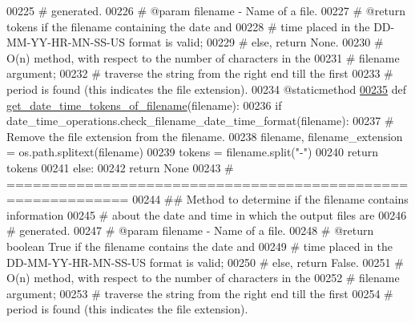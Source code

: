 \begin{DoxyCode}
00225     \textcolor{comment}{#       generated.}
00226     \textcolor{comment}{#   @param filename - Name of a file.}
00227     \textcolor{comment}{#   @return tokens if the filename containing the date and}
00228     \textcolor{comment}{#       time placed in the DD-MM-YY-HR-MN-SS-US format is valid;}
00229     \textcolor{comment}{#       else, return None.}
00230     \textcolor{comment}{#   O(n) method, with respect to the number of characters in the}
00231     \textcolor{comment}{#       filename argument;}
00232     \textcolor{comment}{#       traverse the string from the right end till the first}
00233     \textcolor{comment}{#           period is found (this indicates the file extension).}
00234     @staticmethod
\hypertarget{date__time__processing_8py_source_l00235}{}\hyperlink{classutilities_1_1date__time__processing_1_1date__time__operations_ad6047ac1098493c3511ec209f52250c0}{00235}     \textcolor{keyword}{def }\hyperlink{classutilities_1_1date__time__processing_1_1date__time__operations_ad6047ac1098493c3511ec209f52250c0}{get\_date\_time\_tokens\_of\_filename}(filename):
00236         \textcolor{keywordflow}{if} date\_time\_operations.check\_filename\_date\_time\_format(filename):
00237             \textcolor{comment}{# Remove the file extension from the filename.}
00238             filename, filename\_extension = os.path.splitext(filename)
00239             tokens = filename.split(\textcolor{stringliteral}{"-"})
00240             \textcolor{keywordflow}{return} tokens
00241         \textcolor{keywordflow}{else}:
00242             \textcolor{keywordflow}{return} \textcolor{keywordtype}{None}
00243     \textcolor{comment}{# ============================================================}
00244     \textcolor{comment}{##  Method to determine if the filename contains information}
00245     \textcolor{comment}{#       about the date and time in which the output files are}
00246     \textcolor{comment}{#       generated.}
00247     \textcolor{comment}{#   @param filename - Name of a file.}
00248     \textcolor{comment}{#   @return boolean True if the filename contains the date and}
00249     \textcolor{comment}{#       time placed in the DD-MM-YY-HR-MN-SS-US format is valid;}
00250     \textcolor{comment}{#       else, return False.}
00251     \textcolor{comment}{#   O(n) method, with respect to the number of characters in the}
00252     \textcolor{comment}{#       filename argument;}
00253     \textcolor{comment}{#       traverse the string from the right end till the first}
00254     \textcolor{comment}{#           period is found (this indicates the file extension).}

\end{DoxyCode}
